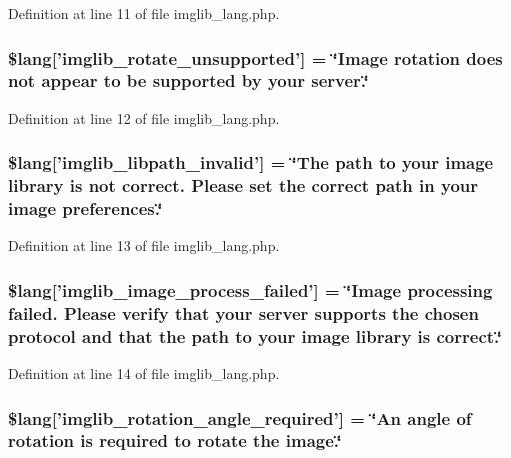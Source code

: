 Definition at line 11 of file imglib\-\_\-lang.\-php.

\subsubsection[{\$lang}]{\setlength{\rightskip}{0pt plus 5cm}\$lang['imglib\-\_\-rotate\-\_\-unsupported'] = \char`\"{}Image rotation does {\bf not} appear {\bf to} be supported by your server.\char`\"{}}\label{imglib__lang_8php_ab1c77c6b58fc5bf8e979ab4237ec87e7}


Definition at line 12 of file imglib\-\_\-lang.\-php.

\subsubsection[{\$lang}]{\setlength{\rightskip}{0pt plus 5cm}\$lang['imglib\-\_\-libpath\-\_\-invalid'] = \char`\"{}The path {\bf to} your image library is {\bf not} correct. Please set the correct path in your image preferences.\char`\"{}}\label{imglib__lang_8php_a8f190c17a02ca89334c8bf0a04333f65}


Definition at line 13 of file imglib\-\_\-lang.\-php.

\subsubsection[{\$lang}]{\setlength{\rightskip}{0pt plus 5cm}\$lang['imglib\-\_\-image\-\_\-process\-\_\-failed'] = \char`\"{}Image processing failed. Please verify that your server supports the chosen protocol {\bf and} that the path {\bf to} your image library is correct.\char`\"{}}\label{imglib__lang_8php_a9ac6659eb97dd12e5c714cc9635cf22e}


Definition at line 14 of file imglib\-\_\-lang.\-php.

\subsubsection[{\$lang}]{\setlength{\rightskip}{0pt plus 5cm}\$lang['imglib\-\_\-rotation\-\_\-angle\-\_\-required'] = \char`\"{}An angle of rotation is required {\bf to} rotate the image.\char`\"{}}\label{imglib__lang_8php_a1110d59ea8fd0564e78068dbda3438fb}


